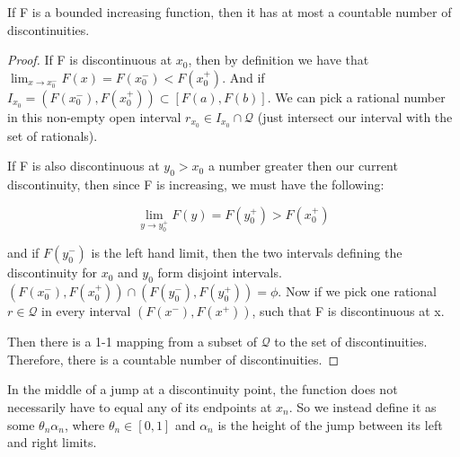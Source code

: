 \documentclass[class=article, crop=false]{standalone}
\begin{document}
		\begin{lemma} 

			If F is a bounded increasing function, then it has at most a countable number of discontinuities.
		\end{lemma}
		\begin{proof}
			If F is discontinuous at $x_0$, then by definition we have that $\lim_{x \rightarrow x_0^-} F(x) = F(x_0^-) < F(x_0^+)$. And if $I_{x_0} = (F(x_0^-), F(x_0^+)) \subset [F(a), F(b)]$. We can pick a rational number in this non-empty open interval $r_{x_0} \in I_{x_0} \cap \mathcal{Q}$ (just intersect our interval with the set of rationals).

			If F is also discontinuous at $y_0 > x_0$ a number greater then our current discontinuity, then since F is increasing, we must have the following:

				$$\lim_{y \rightarrow y_0^+} F(y) = F(y_0^+) > F(x_0^+)$$

			and if $F(y_0^-)$ is the left hand limit, then the two intervals defining the discontinuity for $x_0$ and $y_0$ form disjoint intervals. $(F(x_0^-), F(x_0^+)) \cap (F(y_0^-), F(y_0^+)) = \phi$. Now if we pick one rational $r \in \mathcal{Q}$ in every interval $(F(x^-), F(x^+))$, such that F is discontinuous at x. 

			Then there is a 1-1 mapping from a subset of $\mathcal{Q}$ to the set of discontinuities. Therefore, there is a countable number of discontinuities.
		\end{proof}

		In the middle of a jump at a discontinuity point, the function does not necessarily have to equal any of its endpoints at $x_n$. So we instead define it as some $\theta_n \alpha_n$, where $\theta_n \in [0,1]$ and $\alpha_n$ is the height of the jump between its left and right limits.
\end{document}
